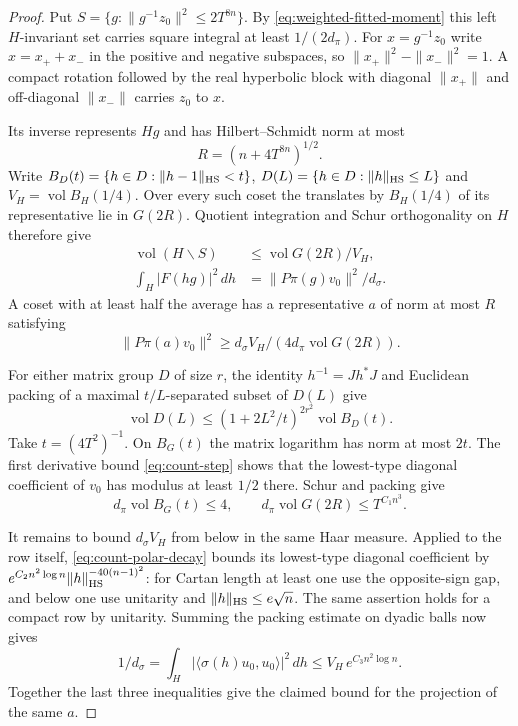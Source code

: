 \begin{proof}
Put \(S=\{g:\|g^{-1}z_0\|^2\le2T^{8n}\}\). By
\eqref{eq:weighted-fitted-moment} this left \(H\)-invariant set
carries square integral at least \(1/(2d_\pi)\). For
\(x=g^{-1}z_0\) write \(x=x_++x_-\) in the positive and negative
subspaces, so \(\|x_+\|^2-\|x_-\|^2=1\). A compact rotation followed
by the real hyperbolic block with diagonal \(\|x_+\|\) and
off-diagonal \(\|x_-\|\) carries \(z_0\) to \(x\).

Its inverse represents \(Hg\) and has Hilbert--Schmidt norm at most
\[
       R=(n+4T^{8n})^{1/2}.
\]
Write \(B_D(t)=\{h\in D:\|h-1\|_{\rm HS}<t\}\),
\(D(L)=\{h\in D:\|h\|_{\rm HS}\le L\}\) and
\(V_H=\operatorname{vol} B_H(1/4)\).
Over every such coset the translates by \(B_H(1/4)\) of its
representative lie in \(G(2R)\). Quotient integration and Schur
orthogonality on \(H\) therefore give
\begin{align*}
 \operatorname{vol}(H\backslash S)&\le\operatorname{vol}G(2R)/V_H,\\
 \int_H|F(hg)|^2\,dh&=\|P\pi(g)v_0\|^2/d_\sigma .
\end{align*}
A coset with at least half the average has a representative \(a\)
of norm at most \(R\) satisfying
\[
 \|P\pi(a)v_0\|^2
      \ge d_\sigma V_H/(4d_\pi\operatorname{vol}G(2R)).
\]

For either matrix group \(D\) of size \(r\), the identity
\(h^{-1}=Jh^*J\) and Euclidean packing of a maximal
\(t/L\)-separated subset of \(D(L)\) give
\[
 \operatorname{vol}D(L)\le(1+2L^2/t)^{2r^2}\operatorname{vol}B_D(t).
\]
Take \(t=(4T^2)^{-1}\). On \(B_G(t)\) the matrix logarithm has norm
at most \(2t\). The first derivative bound \eqref{eq:count-step}
shows that the lowest-type diagonal coefficient of \(v_0\) has
modulus at least \(1/2\) there. Schur and packing give
\[
 d_\pi\operatorname{vol} B_G(t)\le4,\qquad
 d_\pi\operatorname{vol}G(2R)\le T^{C_1 n^3}.
\]

It remains to bound \(d_\sigma V_H\) from below in the same Haar
measure. Applied to the row itself, \eqref{eq:count-polar-decay}
bounds its lowest-type diagonal coefficient by
\(e^{C_2 n^2\log n}\|h\|_{\rm HS}^{-40(n-1)^2}\):
for Cartan length at least one use the opposite-sign gap, and below
one use unitarity and \(\|h\|_{\rm HS}\le e\sqrt n\).
The same assertion holds for a compact row by unitarity.
Summing the packing estimate on dyadic balls now gives
\[
  1/d_\sigma=\int_H|\langle\sigma(h)u_0,u_0\rangle|^2\,dh
       \le V_H\,e^{C_3 n^2\log n}.
\]
Together the last three inequalities give the claimed bound for
the projection of the same \(a\).
\end{proof}

